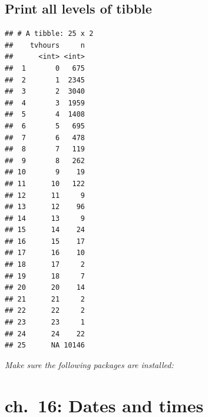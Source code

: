 \documentclass[]{book}
\newenvironment{Shaded}{\begin{snugshade}}{\end{snugshade}}
\newcommand{\DataTypeTok}[1]{\textcolor[rgb]{0.13,0.29,0.53}{#1}}
\newcommand{\KeywordTok}[1]{\textcolor[rgb]{0.13,0.29,0.53}{\textbf{#1}}}
\newcommand{\NormalTok}[1]{#1}
\newcommand{\OperatorTok}[1]{\textcolor[rgb]{0.81,0.36,0.00}{\textbf{#1}}}
\newcommand{\OtherTok}[1]{\textcolor[rgb]{0.56,0.35,0.01}{#1}}
\newcommand{\StringTok}[1]{\textcolor[rgb]{0.31,0.60,0.02}{#1}}
\theoremstyle{definition}
\theoremstyle{definition}
\theoremstyle{definition}
\theoremstyle{remark}
\begin{document}
\hypertarget{print-all-levels-of-tibble}{%
\section{Print all levels of tibble}\label{print-all-levels-of-tibble}}

\begin{Shaded}
\end{Shaded}

\begin{verbatim}
## # A tibble: 25 x 2
##    tvhours     n
##      <int> <int>
##  1       0   675
##  2       1  2345
##  3       2  3040
##  4       3  1959
##  5       4  1408
##  6       5   695
##  7       6   478
##  8       7   119
##  9       8   262
## 10       9    19
## 11      10   122
## 12      11     9
## 13      12    96
## 14      13     9
## 15      14    24
## 16      15    17
## 17      16    10
## 18      17     2
## 19      18     7
## 20      20    14
## 21      21     2
## 22      22     2
## 23      23     1
## 24      24    22
## 25      NA 10146
\end{verbatim}

\emph{Make sure the following packages are installed:}

\hypertarget{ch.-16-dates-and-times}{%
\chapter{ch.~16: Dates and times}\label{ch.-16-dates-and-times}}
\end{document}
